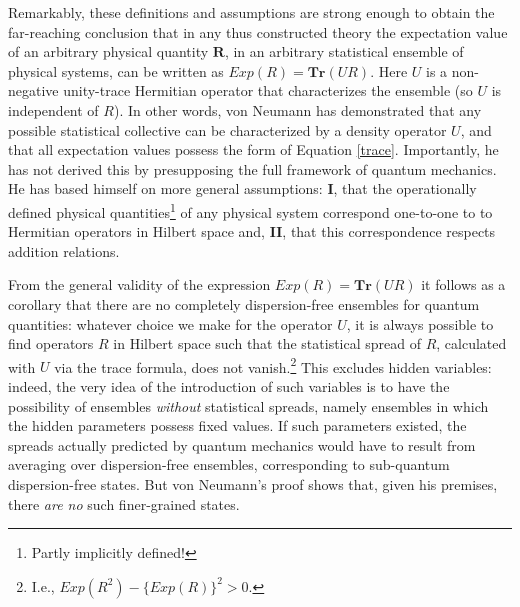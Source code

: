 \documentclass[11pt]{article}
\begin{document}
Remarkably, these definitions and assumptions are strong enough to obtain \cite[pp.\@ 167--168]{VN1} the far-reaching conclusion that in any thus constructed theory the expectation value of an arbitrary physical quantity $\textbf{R}$, in an arbitrary statistical ensemble of physical systems, can be written as $Exp(R) = \textbf{Tr}(UR)$. Here $U$ is a non-negative unity-trace Hermitian operator that characterizes the ensemble (so $U$ is independent of $R$). In other words, von Neumann has demonstrated that any possible statistical collective can be characterized by a density operator $U$, and that all expectation values possess the form of Equation \ref{trace}. Importantly, he has not derived this by presupposing the full framework of quantum mechanics. He has based himself on more general assumptions: \textbf{I}, that the operationally defined physical quantities\footnote{Partly implicitly defined!} of any physical system correspond one-to-one to to Hermitian operators in Hilbert space and, \textbf{II}, that this correspondence respects addition relations.

From the general validity of the expression $Exp(R) = \textbf{Tr}(UR)$ it follows as a corollary that there are no completely dispersion-free ensembles for quantum quantities: whatever choice we make for the operator $U$, it is always possible to find operators $R$ in Hilbert space such that the statistical spread of $R$, calculated with $U$ via the trace formula, does not vanish.\footnote{I.e., $Exp(R^2) - \{Exp(R)\}^2 > 0$.} This excludes hidden variables: indeed, the very idea of the introduction of such variables is to have the possibility of ensembles \emph{without} statistical spreads, namely ensembles in which the hidden parameters possess fixed values. If such parameters existed, the spreads actually predicted by quantum mechanics would have to result from averaging over dispersion-free ensembles, corresponding to sub-quantum dispersion-free states. But von Neumann's proof shows that, given his premises, there \emph{are no} such finer-grained states.
\end{document}
